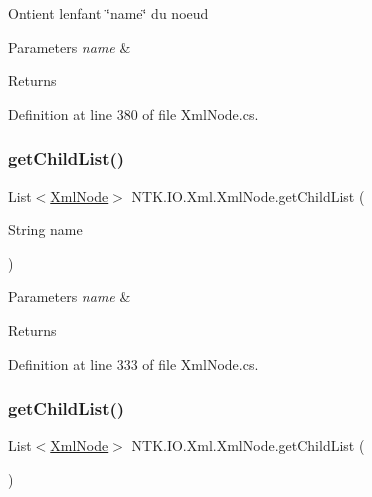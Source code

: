 Ontient l\textquotesingle{}enfant \char`\"{}name\char`\"{} du noeud 


\begin{DoxyParams}{Parameters}
{\em name} & \\
\hline
\end{DoxyParams}
\begin{DoxyReturn}{Returns}

\end{DoxyReturn}


Definition at line 380 of file Xml\+Node.\+cs.

\mbox{\label{class_n_t_k_1_1_i_o_1_1_xml_1_1_xml_node_a75af2d3186bd3ed01bec45ded6413923}} 
\subsubsection{\texorpdfstring{getChildList()}{getChildList()}\hspace{0.1cm}{\footnotesize\ttfamily [1/2]}}
{\footnotesize\ttfamily List$<$\mbox{\hyperlink{class_n_t_k_1_1_i_o_1_1_xml_1_1_xml_node}{Xml\+Node}}$>$ N\+T\+K.\+I\+O.\+Xml.\+Xml\+Node.\+get\+Child\+List (\begin{DoxyParamCaption}\item[{String}]{name }\end{DoxyParamCaption})}






\begin{DoxyParams}{Parameters}
{\em name} & \\
\hline
\end{DoxyParams}
\begin{DoxyReturn}{Returns}

\end{DoxyReturn}


Definition at line 333 of file Xml\+Node.\+cs.

\mbox{\label{class_n_t_k_1_1_i_o_1_1_xml_1_1_xml_node_affb0d7cd6b58825a00fd124a14537f73}} 
\subsubsection{\texorpdfstring{getChildList()}{getChildList()}\hspace{0.1cm}{\footnotesize\ttfamily [2/2]}}
{\footnotesize\ttfamily List$<$\mbox{\hyperlink{class_n_t_k_1_1_i_o_1_1_xml_1_1_xml_node}{Xml\+Node}}$>$ N\+T\+K.\+I\+O.\+Xml.\+Xml\+Node.\+get\+Child\+List (\begin{DoxyParamCaption}{ }\end{DoxyParamCaption})}





